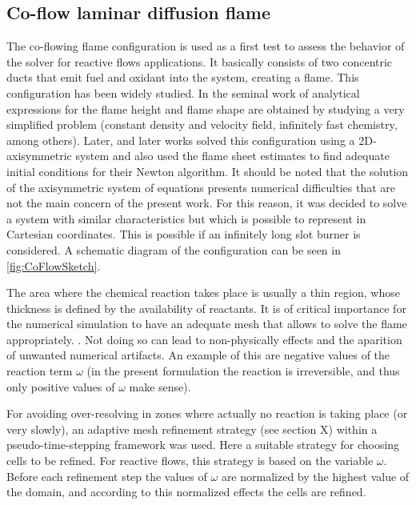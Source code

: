 
\subsection{Co-flow laminar diffusion flame}\label{ssec:coflowFlame}
The co-flowing flame configuration is used as a first test to assess the behavior of the solver for reactive flows applications. It basically consists of two concentric ducts that emit fuel and oxidant into the system, creating a flame. This configuration has been widely studied. In the seminal work of \cite{burkeDiffusionFlames1928} analytical expressions for the flame height and flame shape are obtained by studying a very simplified problem (constant density and velocity field, infinitely fast chemistry, among others). Later, \cite{smookeNumericalModelingAxisymmetric1992} and later works solved this configuration using a 2D-axisymmetric system and also used the flame sheet estimates to find adequate initial conditions for their Newton algorithm. It should be noted that the solution of the axisymmetric system of equations presents numerical difficulties that are not the main concern of the present work. For this reason, it was decided to solve a system with similar characteristics but which is possible to represent in Cartesian coordinates. This is possible if an infinitely long slot burner is considered. A schematic diagram of the configuration can be seen in \cref{fig:CoFlowSketch}. 


The area where the chemical reaction takes place is usually a thin region, whose thickness is defined by the availability of reactants. It is of critical importance for the numerical simulation to have an adequate mesh that allows to solve the flame appropriately. . Not doing so can lead to non-physically effects and the aparition of unwanted numerical artifacts. An example of this are negative values of the reaction term $\omega$ (in the present formulation the reaction is irreversible, and thus only positive values of $\omega$ make sense). 

For avoiding over-resolving in zones where actually no reaction is taking place (or very slowly), an adaptive mesh refinement strategy  (see section X) within a pseudo-time-stepping framework was used.  Here a suitable strategy for choosing cells to be refined. For reactive flows, this strategy is based on the variable $\omega$.
Before each refinement step the values of $\omega$ are normalized by the highest value of the domain, and according to this normalized effects the cells are refined. %

